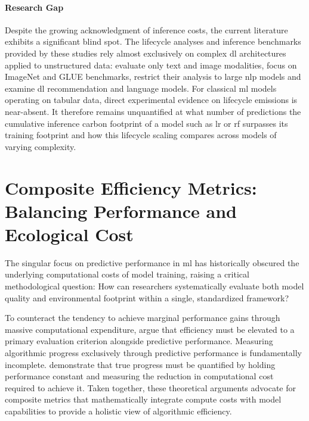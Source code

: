 \paragraph{Research Gap}
Despite the growing acknowledgment of inference costs, the current literature exhibits a significant blind spot. The lifecycle analyses and inference benchmarks provided by these studies rely almost exclusively on complex \gls{dl} architectures applied to unstructured data: \citeauthor{luccioniPowerHungryProcessing2024} \cite{luccioniPowerHungryProcessing2024} evaluate only text and image modalities, \citeauthor{desislavovTrendsAIInference2023} \cite{desislavovTrendsAIInference2023} focus on ImageNet and GLUE benchmarks, \citeauthor{pattersonCarbonEmissionsLarge2021} \cite{pattersonCarbonEmissionsLarge2021} restrict their analysis to large \gls{nlp} models and \citeauthor{wuSustainableAIEnvironmental2022} \cite{wuSustainableAIEnvironmental2022} examine \gls{dl} recommendation and language models. For classical \gls{ml} models operating on tabular data, direct experimental evidence on lifecycle emissions is near-absent. It therefore remains unquantified at what number of predictions the cumulative inference carbon footprint of a model such as \gls{lr} or \gls{rf} surpasses its training footprint and how this lifecycle scaling compares across models of varying complexity.

\section{Composite Efficiency Metrics: Balancing Performance and Ecological Cost}
\label{sec:related_metrics}

The singular focus on predictive performance in \gls{ml} has historically obscured the underlying computational costs of model training, raising a critical methodological question: How can researchers systematically evaluate both model quality and environmental footprint within a single, standardized framework?

To counteract the tendency to achieve marginal performance gains through massive computational expenditure, \citeauthor{schwartzGreenAI2020} \cite{schwartzGreenAI2020} argue that efficiency must be elevated to a primary evaluation criterion alongside predictive performance. Measuring algorithmic progress exclusively through predictive performance is fundamentally incomplete. \citeauthor{hernandezMeasuringAlgorithmicEfficiency2020} \cite{hernandezMeasuringAlgorithmicEfficiency2020} demonstrate that true progress must be quantified by holding performance constant and measuring the reduction in computational cost required to achieve it. Taken together, these theoretical arguments advocate for composite metrics that mathematically integrate compute costs with model capabilities to provide a holistic view of algorithmic efficiency.

